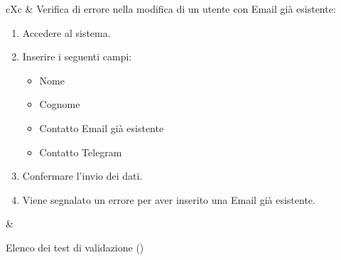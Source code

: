 \begin{table}[H]
\begin{VTtable}[1.7]{\textwidth}{cXc}
        \addtotv & Verifica di errore nella modifica di un utente con Email già esistente:
        \begin{enumerate}
            \item Accedere al sistema.
            \item Inserire i seguenti campi:
            \begin{itemize}
                \item Nome
                \item Cognome
                \item Contatto Email già esistente
                \item Contatto Telegram
            \end{itemize}
            \item Confermare l'invio dei dati.
            \item Viene segnalato un errore per aver inserito una Email già esistente.
        \end{enumerate}
        & \TNI \\
        \bottomrule
	\end{VTtable}
	\caption{Elenco dei test di validazione (\thetableCounter)}
\end{table}

